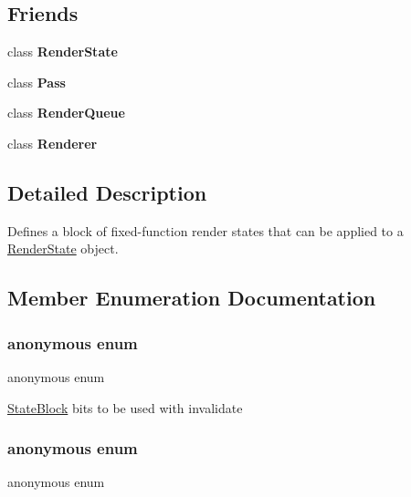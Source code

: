 \subsection*{Friends}
\begin{DoxyCompactItemize}
\item 
\mbox{\label{classRenderState_1_1StateBlock_a85e72071c3fd11af2f7e64e85c7e07b8}} 
class {\bfseries Render\+State}
\item 
\mbox{\label{classRenderState_1_1StateBlock_abe77423eb27f643233ef051559a64882}} 
class {\bfseries Pass}
\item 
\mbox{\label{classRenderState_1_1StateBlock_a0472b1e9120abbcb20b6a69292d523bf}} 
class {\bfseries Render\+Queue}
\item 
\mbox{\label{classRenderState_1_1StateBlock_a7482e5338f9824f1190a0846d209c666}} 
class {\bfseries Renderer}
\end{DoxyCompactItemize}


\subsection{Detailed Description}
Defines a block of fixed-\/function render states that can be applied to a \hyperlink{classRenderState}{Render\+State} object. 

\subsection{Member Enumeration Documentation}
\mbox{\label{classRenderState_1_1StateBlock_a672e4bc52d6a840fd80b97b6cdeac014}} 
\subsubsection{\texorpdfstring{anonymous enum}{anonymous enum}}
{\footnotesize\ttfamily anonymous enum}

\hyperlink{classRenderState_1_1StateBlock}{State\+Block} bits to be used with invalidate \mbox{\label{classRenderState_1_1StateBlock_ae32ca4bf81360dd8643910da7c104367}} 
\subsubsection{\texorpdfstring{anonymous enum}{anonymous enum}}
{\footnotesize\ttfamily anonymous enum}

